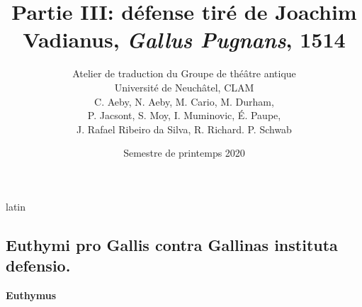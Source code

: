 \documentclass[12pt]{book}
\renewenvironment{latin}
    	{\begin{hyphenrules}{latin}}
    	{\end{hyphenrules}}
\begin{document}
        \title{Partie III: défense tiré de Joachim Vadianus, \textit{Gallus Pugnans}, 1514}
        \author{Atelier de traduction du Groupe de théâtre antique\\
            Université de Neuchâtel, CLAM\\
            C. Aeby, N. Aeby, M. Cario, M. Durham,\\ 
            P. Jacsont, S. Moy, I. Muminovic, É. Paupe,\\
            J. Rafael Ribeiro da Silva, R. Richard. P. Schwab}
        \date{Semestre de printemps 2020}
        
        \maketitle
        \begin{pages}
        \begin{latin}
        \begin{Leftside}
        \beginnumbering 
            \pstart\section*{Euthymi pro Gallis contra Gallinas instituta defensio.}\pend\pstart\textbf{Euthymus}\hspace{1cm} 

\end{Leftside}
\end{latin}
\end{pages}
\end{document}
